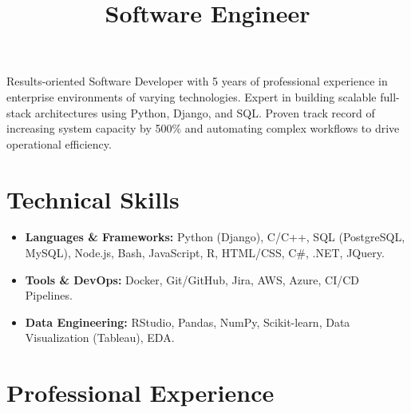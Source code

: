 \documentclass[11pt,a4paper,sans]{moderncv}
\title{Software Engineer}
\begin{document}
\makecvtitle

\vspace{-2em}
\small{Results-oriented Software Developer with 5 years of professional experience in enterprise environments of varying technologies. Expert in building scalable full-stack architectures using Python, Django, and SQL. Proven track record of increasing system capacity by 500\% and automating complex workflows to drive operational efficiency.}

\section{Technical Skills}
\begin{itemize}
    \item \textbf{Languages \& Frameworks:} Python (Django), C/C++, SQL (PostgreSQL, MySQL), Node.js, Bash, JavaScript, R, HTML/CSS, C\#, .NET, JQuery.
    \item \textbf{Tools \& DevOps:} Docker, Git/GitHub, Jira, AWS, Azure, CI/CD Pipelines.
    \item \textbf{Data Engineering:} RStudio, Pandas, NumPy, Scikit-learn, Data Visualization (Tableau), EDA.
\end{itemize}

\section{Professional Experience}

\end{document}
